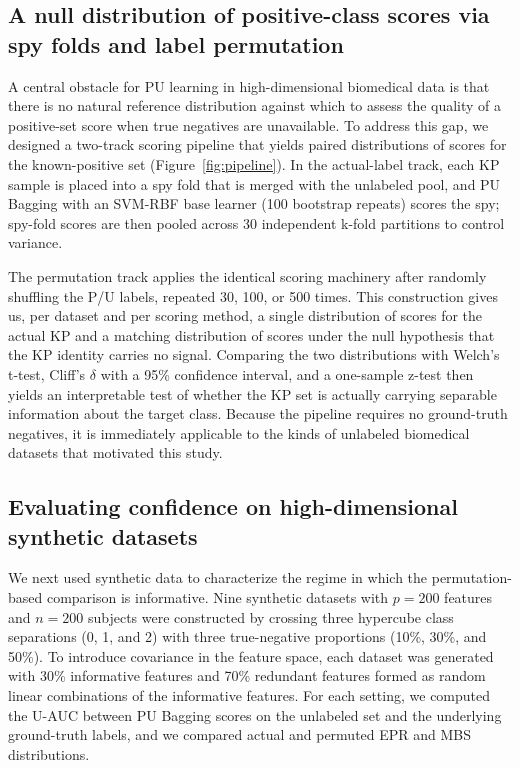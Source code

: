 \documentclass[11pt]{article}
\begin{document}
\subsection{A null distribution of positive-class scores via spy folds and label permutation}

A central obstacle for PU learning in high-dimensional biomedical data is that there is no natural reference distribution against which to assess the quality of a positive-set score when true negatives are unavailable. To address this gap, we designed a two-track scoring pipeline that yields paired distributions of scores for the known-positive set (Figure~\ref{fig:pipeline}). In the actual-label track, each KP sample is placed into a spy fold that is merged with the unlabeled pool, and PU Bagging with an SVM-RBF base learner (100 bootstrap repeats) scores the spy; spy-fold scores are then pooled across 30 independent k-fold partitions to control variance.

The permutation track applies the identical scoring machinery after randomly shuffling the P/U labels, repeated 30, 100, or 500 times. This construction gives us, per dataset and per scoring method, a single distribution of scores for the actual KP and a matching distribution of scores under the null hypothesis that the KP identity carries no signal. Comparing the two distributions with Welch's t-test, Cliff's $\delta$ with a 95\% confidence interval, and a one-sample z-test then yields an interpretable test of whether the KP set is actually carrying separable information about the target class. Because the pipeline requires no ground-truth negatives, it is immediately applicable to the kinds of unlabeled biomedical datasets that motivated this study.

\subsection{Evaluating confidence on high-dimensional synthetic datasets}

We next used synthetic data to characterize the regime in which the permutation-based comparison is informative. Nine synthetic datasets with $p = 200$ features and $n = 200$ subjects were constructed by crossing three hypercube class separations (0, 1, and 2) with three true-negative proportions (10\%, 30\%, and 50\%). To introduce covariance in the feature space, each dataset was generated with 30\% informative features and 70\% redundant features formed as random linear combinations of the informative features. For each setting, we computed the U-AUC between PU Bagging scores on the unlabeled set and the underlying ground-truth labels, and we compared actual and permuted EPR and MBS distributions.
\end{document}
